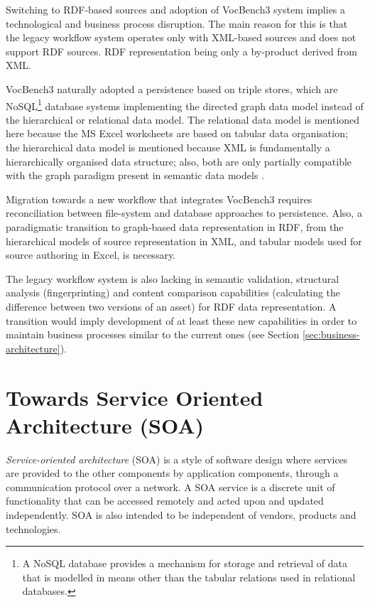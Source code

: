 	Switching to RDF-based sources and adoption of VocBench3 system implies a technological and business process disruption. The main reason for this is that the legacy workflow system operates only with XML-based sources and does not support RDF sources. RDF representation being only a by-product derived from XML. 
	
	VocBench3 naturally adopted a persistence based on triple stores, which are NoSQL\footnote{A NoSQL database provides a mechanism for storage and retrieval of data that is modelled in means other than the tabular relations used in relational databases.} database systems implementing the directed graph data model instead of the hierarchical or relational data model. The relational data model is mentioned here because the MS Excel worksheets are based on tabular data organisation; the hierarchical data model is mentioned because XML is fundamentally a hierarchically organised data structure; also, both are only partially compatible with the graph paradigm present in semantic data models \citep{rdf-semantics}. 
	
	Migration towards a new workflow that integrates VocBench3 requires reconciliation between file-system and database approaches to persistence. Also, a paradigmatic transition to graph-based data representation in RDF, from the hierarchical models of source representation in XML, and tabular models used for source authoring in Excel, is necessary.
	 
	The legacy workflow system is also lacking in semantic validation, structural analysis (fingerprinting) and content comparison capabilities (calculating the difference between two versions of an asset) for RDF data representation. A transition would imply development of at least these new capabilities in order to maintain business processes similar to the current ones (see Section \ref{sec:business-architecture}). 
	
	\section{Towards Service Oriented Architecture (SOA)}
	\label{sec:soa}
	
	\textit{Service-oriented architecture} (SOA) \cite{open2016soa} is a style of software design where services are provided to the other components by application components, through a communication protocol over a network. A SOA service is a discrete unit of functionality that can be accessed remotely and acted upon and updated independently. SOA is also intended to be independent of vendors, products and technologies.
	
